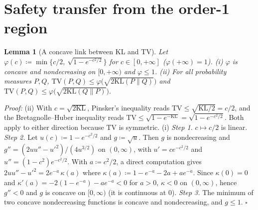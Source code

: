 \documentclass{article}
\newcommand{\TV}{\mathrm{TV}}
\newcommand{\KL}{\mathrm{KL}}
\theoremstyle{plain}
\newtheorem{lemma}{Lemma}
\begin{document}
\section{Safety transfer from the order-1 region}\label{sec:safety}

\begin{lemma}[A concave link between KL and TV]\label{lem:phi}
Let $\varphi(c)\coloneqq\min\big\{c/2,\ \sqrt{1-e^{-c^2/2}}\big\}$ for $c\in[0,+\infty]$
($\varphi(+\infty)=1$). (i) $\varphi$ is concave and nondecreasing on $[0,+\infty)$ and
$\varphi\leq1$. (ii) For all probability measures $P,Q$,
$\TV(P,Q)\leq\varphi\big(\sqrt{2\KL(P\|Q)}\big)$ and $\TV(P,Q)\leq\varphi\big(\sqrt{2\KL(Q\|P)}\big)$.
\end{lemma}
\textit{Proof:}
(ii) With $c=\sqrt{2\KL}$, Pinsker's inequality \citep[Lemma~2.5]{tsybakov2009introduction}
reads $\TV\leq\sqrt{\KL/2}=c/2$, and the Bretagnolle--Huber inequality
\citep{bretagnolle1979estimation,canonne2022short} reads
$\TV\leq\sqrt{1-e^{-\KL}}=\sqrt{1-e^{-c^2/2}}$. Both apply to either direction because $\TV$ is
symmetric.
(i) \emph{Step 1.} $c\mapsto c/2$ is linear. \emph{Step 2.} Let $u(c)\coloneqq1-e^{-c^2/2}$ and
$g\coloneqq\sqrt{u}$. Then $g$ is nondecreasing and $g''=(2uu''-u'^2)/(4u^{3/2})$ on $(0,\infty)$,
with $u'=ce^{-c^2/2}$ and $u''=(1-c^2)e^{-c^2/2}$. With $a\coloneqq c^2/2$, a direct computation gives
$2uu''-u'^2=2e^{-a}\,\kappa(a)$ where $\kappa(a)\coloneqq1-e^{-a}-2a+ae^{-a}$. Since $\kappa(0)=0$ and
$\kappa'(a)=-2(1-e^{-a})-ae^{-a}<0$ for $a>0$, $\kappa<0$ on $(0,\infty)$, hence $g''<0$ and $g$ is
concave on $[0,\infty)$ (it is continuous at $0$). \emph{Step 3.} The minimum of two concave
nondecreasing functions is concave and nondecreasing, and $g\leq1$. \hfill $\square$
\end{document}
